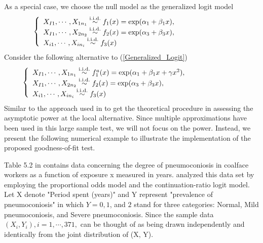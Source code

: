 \documentclass[12]{interact}
\theoremstyle{plain}%
\theoremstyle{definition}
\theoremstyle{remark}
\begin{document}
As a special case, we choose the null model as the generalized logit model
\begin{equation}
	\left\{ \begin{array}{llll}
		$$X_{I1}, \cdots, X_{1n_1} \stackrel{\mathrm{ i.i.d.}}{\sim}f_1(x)=\exp(\alpha_1+\beta_1x),\hspace{1.in}$$\\
		$$X_{I1}, \cdots, X_{2n_2} \stackrel{\mathrm{ i.i.d.}}{\sim}f_2(x)=\exp(\alpha_3+\beta_3x),\hspace{1.in}$$\\
		$$X_{i1}, \cdots, X_{in_i} \stackrel{\mathrm{ i.i.d.}}{\sim}f_3(x) $$
	\end{array}\right.
	\label{Generalized_Logit}
\end{equation}
Consider the following alternative to (\ref{Generalized_Logit})
\begin{equation}
	\left\{ \begin{array}{llll}
		$$X_{I1}, \cdots, X_{1n_1} \stackrel{\mathrm{ i.i.d.}}{\sim}f_1^a(x)=\exp(\alpha_1+\beta_1x+\gamma x^2),\hspace{1.in}$$\\
		$$X_{I1}, \cdots, X_{2n_2} \stackrel{\mathrm{ i.i.d.}}{\sim}f_2(x)=\exp(\alpha_3+\beta_3x),\hspace{1.in}$$\\
		$$X_{i1}, \cdots, X_{in_i} \stackrel{\mathrm{ i.i.d.}}{\sim}f_3(x) $$
	\end{array}\right.
	\label{Generalized_Logit_Ha}
\end{equation}
Similar to the approach used in \cite{ZhangBiao-JMA-2002} to get the theoretical procedure in assessing the asymptotic power at the local alternative. Since multiple approximations have been used in this large sample test, we will not focus on the power. Instead, we present the following numerical example to illustrate the implementation of the proposed goodness-of-fit test.

   Table 5.2 in \cite{McCullagh-Nelder-book-1989} contains
data concerning the degree of pneumoconiosis in coalface workers as
a function of exposure x measured in years. \cite{McCullagh-Nelder-book-1989}
analyzed this data set by employing the proportional odds model and the
continuation-ratio logit model. Let X denote "Period spent (years)" and Y represent "prevalence of pneumoconiosis" in which $Y=0, 1$, and $2$ stand for three categories: Normal, Mild pneumoconiosis,
and Severe pneumoconiosis. Since the sample data $(X_i, Y_i), i=1, \cdots, 371,$
can be thought of as being drawn independently and identically from the joint
distribution of (X, Y).
\end{document}
